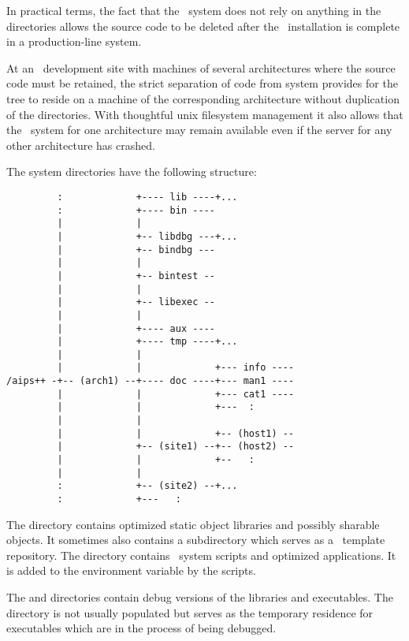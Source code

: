 In practical terms, the fact that the \aipspp\ system does not rely on
anything in the  directories allows the source code to be
deleted after the \aipspp\ installation is complete in a production-line
system.

At an \aipspp\ development site with machines of several architectures where
the source code must be retained, the strict separation of code from system
provides for the  tree to reside on a machine of the
corresponding architecture without duplication of the  directories.
With thoughtful unix filesystem management it also allows that the \aipspp\ 
system for one architecture may remain available even if the server for any
other architecture has crashed.

The system directories have the following structure:

\begin{verbatim}
         :             +---- lib ----+...
         :             +---- bin ----
         |             |
         |             +-- libdbg ---+...
         |             +-- bindbg ---
         |             |
         |             +-- bintest --
         |             |
         |             +-- libexec --
         |             |
         |             +---- aux ----
         |             +---- tmp ----+...
         |             |
         |             |             +--- info ----
/aips++ -+-- (arch1) --+---- doc ----+--- man1 ----
         |             |             +--- cat1 ----
         |             |             +---  :
         |             |
         |             |             +-- (host1) --
         |             +-- (site1) --+-- (host2) --
         |             |             +--   :
         |             |
         :             +-- (site2) --+...
         :             +---   :
\end{verbatim}

\noindent
The  directory contains optimized static object libraries and
possibly sharable objects.  It sometimes also contains a subdirectory which
serves as a \cplusplus\ template repository.  The \file{bin} directory
contains \aipspp\ system scripts and optimized applications.  It is added to
the \code{PATH} environment variable by the \exeref{aipsinit} scripts.

The  and  directories contain debug versions of the
libraries and executables.  The \file{bindbg} directory is not usually
populated but serves as the temporary residence for executables which are in
the process of being debugged.

